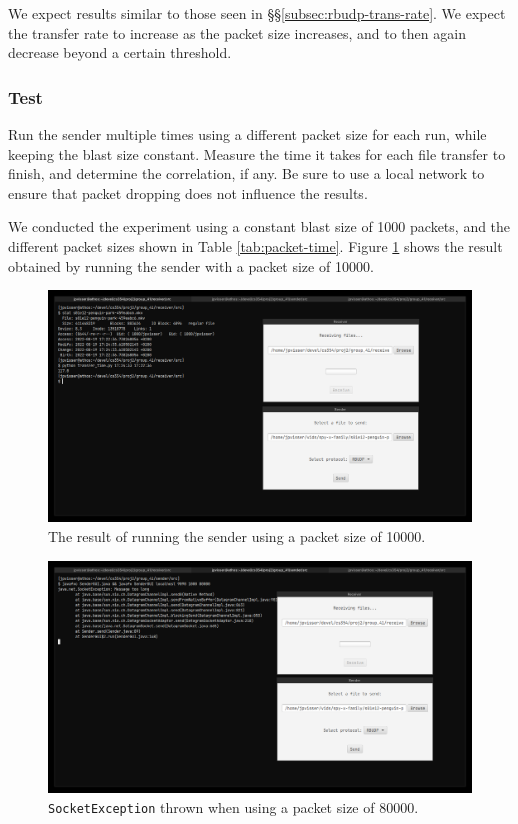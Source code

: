 \documentclass[10pt, a4paper]{article}
\begin{document}
We expect results similar to those seen in \S\S\ref{subsec:rbudp-trans-rate}. We
expect the transfer rate to increase as the packet size increases, and to then
again decrease beyond a certain threshold.

\subsubsection{Test}
\label{subsubsec:test-3}

Run the sender multiple times using a different packet size for each run, while
keeping the blast size constant. Measure the time it takes for each file
transfer to finish, and determine the correlation, if any. Be sure to use a
local network to ensure that packet dropping does not influence the results.

We conducted the experiment using a constant blast size of 1000 packets, and the
different packet sizes shown in Table \ref{tab:packet-time}. Figure
\ref{fig:exp3-1} shows the result obtained by running the sender with a packet
size of 10000.

\begin{figure}
  \centering
  \includegraphics[width=12cm]{exp3-2}
  \caption{The result of running the sender using a packet size of 10000.}
  \label{fig:exp3-1}
\end{figure}

\begin{figure}
  \centering
  \includegraphics[width=12cm]{exp3-3}
  \caption{\texttt{SocketException} thrown when using a packet size of 80000.}
  \label{fig:exp3-2}
\end{figure}
\end{document}

